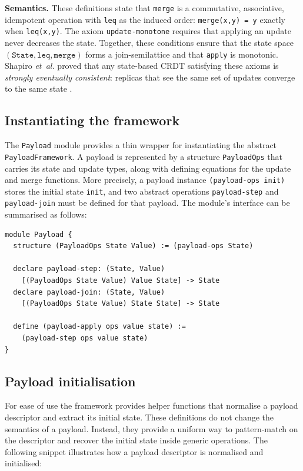 \noindent\textbf{Semantics.}  These definitions state that \texttt{merge} is a commutative, associative, idempotent operation with \texttt{leq} as the induced order: \texttt{merge(x,y) = y} exactly when \texttt{leq(x,y)}.  The axiom \texttt{update-monotone} requires that applying an update never decreases the state.  Together, these conditions ensure that the state space $(\texttt{State},\texttt{leq},\texttt{merge})$ forms a join-semilattice and that \texttt{apply} is monotonic.  Shapiro \emph{et~al.} proved that any state-based CRDT satisfying these axioms is \emph{strongly eventually consistent}: replicas that see the same set of updates converge to the same state \cite{shapiro2011conflict}.

\subsection{Instantiating the framework}

The \texttt{Payload} module provides a thin wrapper for instantiating the abstract \texttt{PayloadFramework}.  A payload is represented by a structure \texttt{PayloadOps} that carries its state and update types, along with defining equations for the update and merge functions. More precisely, a payload instance \lstinline{(payload-ops init)} stores the initial state \lstinline{init}, and two abstract operations \lstinline{payload-step} and \lstinline{payload-join} must be defined for that payload.  The module’s interface can be summarised as follows:

\begin{lstlisting}[language=Athena,style=athena]
module Payload {
  structure (PayloadOps State Value) := (payload-ops State)

  declare payload-step: (State, Value)
    [(PayloadOps State Value) Value State] -> State
  declare payload-join: (State, Value)
    [(PayloadOps State Value) State State] -> State

  define (payload-apply ops value state) :=
    (payload-step ops value state)
}
\end{lstlisting}

\subsection{Payload initialisation}

For ease of use the framework provides helper functions that normalise a payload descriptor and extract its initial state.  These definitions do not change the semantics of a payload. Instead, they provide a uniform way to pattern‑match on the descriptor and recover the initial state inside generic operations.  The following snippet illustrates how a payload descriptor is normalised and initialised:

